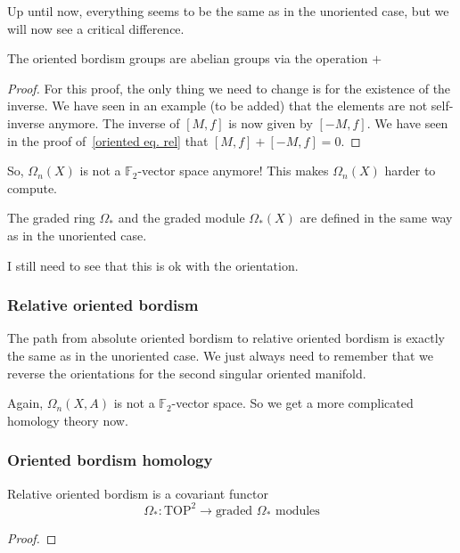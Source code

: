 \documentclass[a4paper,11pt]{article}
\begin{document}
Up until now, everything seems to be the same as in the unoriented case, but we will now see a critical difference.

\begin{theorem}
    The oriented bordism groups are abelian groups via the operation \(+\)
\end{theorem}

\begin{proof}
    For this proof, the only thing we need to change is for the existence of the inverse. We have seen in an example (to be added) that the elements are not self-inverse anymore. The inverse of \([M,f]\) is now given by \([-M,f]\). We have seen in the proof of\ \ref{oriented eq. rel} that \([M,f]+[-M,f]=0\).
\end{proof}

So, \(\Omega_n(X)\) is not a \(\mathbb{F}_2\)-vector space anymore! This makes \(\Omega_n(X)\) harder to compute.

The graded ring \(\Omega_\ast\) and the graded module \(\Omega_\ast(X)\) are defined in the same way as in the unoriented case.

I still need to see that this is ok with the orientation.

\subsubsection{Relative oriented bordism}

The path from absolute oriented bordism to relative oriented bordism is exactly the same as in the unoriented case. We just always need to remember that we reverse the orientations for the second singular oriented manifold.

Again, \(\Omega_n(X,A)\) is not a \(\mathbb{F}_2\)-vector space. So we get a more complicated homology theory now.

\subsubsection{Oriented bordism homology}

\begin{lemma}
    Relative oriented bordism is a covariant functor
    \[\Omega_\ast:\mathrm{TOP}^2\to\text{graded }\Omega_\ast\text{ modules}\]
\end{lemma}

\begin{proof}
    
\end{proof}
\end{document}

